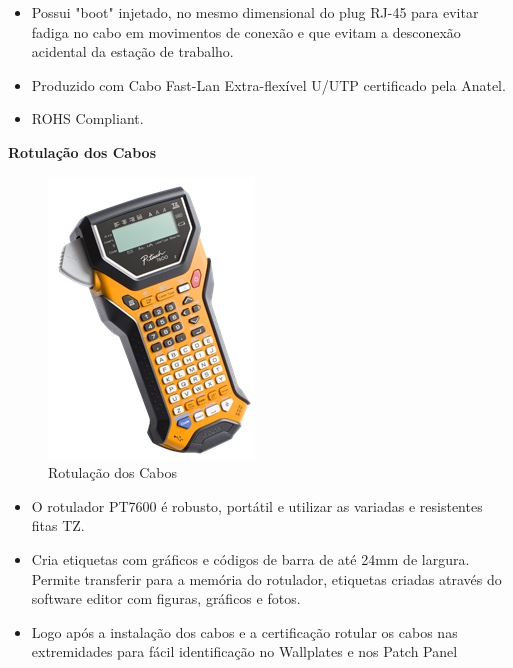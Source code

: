 \documentclass[	DIV=calc,%
							paper=a4,%
							fontsize=12pt,%
							onecolumn]{scrartcl}	 					%
\begin{document}
\begin{itemize}
	\item Possui "boot" injetado, no mesmo dimensional do plug RJ-45 para evitar fadiga no cabo em movimentos de conexão e que evitam a desconexão acidental da estação de trabalho. 
	\item Produzido com Cabo Fast-Lan Extra-flexível U/UTP certificado pela Anatel.
	\item ROHS Compliant.
\end{itemize}

\textbf{Rotulação dos Cabos}

\begin{figure}[!h]
	\centering
	\caption{Rotulação dos Cabos}
	\includegraphics{rotulador_1}
\end{figure}

\begin{itemize}
	\item O rotulador PT7600 é robusto, portátil e utilizar as variadas e resistentes fitas TZ.
	\item Cria etiquetas com gráficos e códigos de barra de até 24mm de largura. Permite transferir para a memória do rotulador, etiquetas criadas através do software editor com figuras, gráficos e fotos.
	\item Logo após a instalação dos cabos e a certificação rotular os cabos nas extremidades para fácil identificação no Wallplates e nos Patch Panel
\end{itemize}
\end{document}
